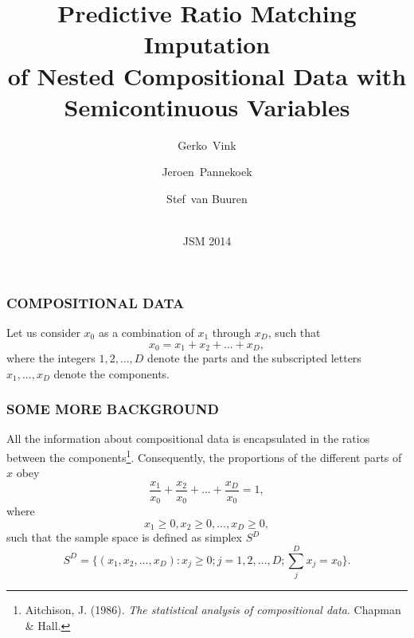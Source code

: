 \documentclass[aspectratio=169]{beamer} %
\title[Imputing squares] {Predictive Ratio Matching Imputation\\ {\small of Nested Compositional Data with Semicontinuous Variables}}
\author[Vink, Pannekoek, Van Buuren]
{
  Gerko~Vink \and
  Jeroen~Pannekoek \and
  Stef~van Buuren
}
\date[ISA 2014]
{\vspace{.5 in}\\JSM 2014 \vskip6mm}
\begin{document}
\titlepage
{}

\begin{frame}
  \frametitle{COMPOSITIONAL DATA}
Let us consider $x_0$ as a combination of $x_1$ through $x_D$, such that
\begin{equation*}
\label{eq1}
x_0=x_1+x_2+...+x_D,
\end{equation*}
where the integers $1,2,...,D$ denote the parts and the subscripted letters $x_1, ...,x_D$ denote the components.
 \end{frame}

\begin{frame}
  \frametitle{SOME MORE BACKGROUND}
All the information about compositional data is encapsulated in the ratios between the components\footnote{\tiny{Aitchison, J. (1986). \emph{The statistical analysis of compositional data}. Chapman \& Hall.}}. Consequently, the proportions of the different parts of $x$ obey 
\begin{equation*}
\label{eq2}
\frac{x_1}{x_0}+\frac{x_2}{x_0}+...+\frac{x_D}{x_0}=1,
\end{equation*}
where
\begin{equation*}
\label{eq3}
x_1\geq0,x_2\geq0,...,x_D\geq0,
\end{equation*}
such that the sample space is defined as simplex $S^D$
\begin{equation*}
S^D = \{(x_1,x_2,\dots,x_D) : x_j \geq 0;j = 1,2,\dots,D;\sum_{j}^{D}x_j = x_0\}.
\end{equation*}
\end{frame}
\end{document}
